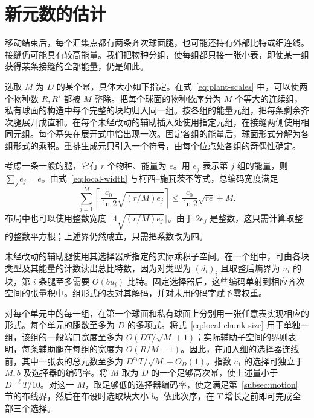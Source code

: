 


\section{新元数的估计}\label{subsec:local-output}

移动结束后，每个汇集点都有两条齐次球面腿，也可能还持有外部比特或细连线。接缝仍可能具有较高能量。我们把物种分组，使每组都只接一张小表，即使某一组获得某条接缝的全部能量，仍是如此。

选取 \(M\) 为 \(D\) 的某个幂，具体大小如下指定。在式~\eqref{eq:plant-scales} 中，可以使两个物种数 \(R,R'\) 都被 \(M\) 整除。把每个球面的物种依序分为 \(M\) 个等大的连续组，私有球面的构造中每个完整的块均归入同一组。按各组的能量元组，把每条剩余齐次腿展开成直和。在每个未经改动的辅助插入处使用指定元组，在接缝两侧使用相同元组。每个基矢在展开式中恰出现一次。固定各组的能量后，球面形式分解为各组形式的乘积。重排生成元只引入一个符号，由每个位点处各组的奇偶性确定。

考虑一条一般的腿，它有 \(r\) 个物种、能量为 \(e\)。用 \(e_j\) 表示第 \(j\) 组的能量，则 \(\sum_j e_j=e\)。由式~\eqref{eq:local-width} 与柯西–施瓦茨不等式，总编码宽度满足
\begin{equation}\label{eq:local-chunk-size}
 \sum_{j=1}^M\left\lceil\frac{c_0}{\ln 2}\sqrt{(r/M)e_j}\right\rceil
 \le \frac{c_0}{\ln 2}\sqrt{r e}+M .
\end{equation} 布局中也可以使用整数宽度 \(\lceil4\sqrt{(r/M)e_j}\rceil\)。由于 \(2e_j\) 是整数，这只需计算取整的整数平方根；上述界仍然成立，只需把系数改为四。

未经改动的辅助腿使用其选择器所指定的实际乘积子空间。在一个组中，可由各块类型及其能量的计数读出总比特数，因为对类型为 \((d_i)_i\) 且取整后熵界为 \(u_i\) 的块，第 \(i\) 条腿至多需要 \(O(bu_i)\) 比特。固定选择器后，这些编码单射到相应齐次空间的张量积中。组形式的表对其解码，并对未用的码字赋予零权重。

对每个单元中的每一组，在第一个球面和私有球面上分别用一张任意表实现相应的形式。每个单元的腿数至多为 \(D\) 的多项式。将式~\eqref{eq:local-chunk-size} 用于单独一组，该组的一般端口宽度至多为 \(O(DT/\sqrt M+1)\)；实际辅助子空间的界则表明，每条辅助腿在每组的宽度为 \(O(R/M+1)\)。因此，在加入细的选择器连线前，其中一张表的总元数至多为 \(D^{c_1}T/\sqrt M+O_D(1)\)。指数 \(c_1\) 的选择可独立于 \(M,b\) 及选择器的编码率。将 \(M\) 取为 \(D\) 的一个足够高次幂，使上述量小于 \(D^{-\ell}T/10\)。对这一 \(M\)，取足够低的选择器编码率，使之满足第~\ref{subsec:motion} 节的布线界，然后在布设时选取块大小 \(b\)。依此次序，在 \(T\) 增长之前即可完成全部三个选择。

